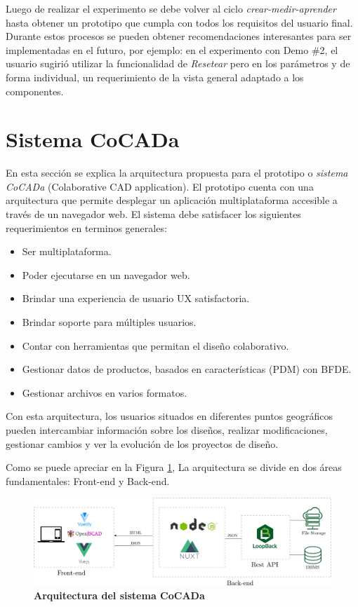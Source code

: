 Luego de realizar el experimento se debe volver al ciclo \textit{crear-medir-aprender} hasta obtener un prototipo que cumpla con todos los requisitos del usuario final. Durante estos procesos se pueden obtener recomendaciones interesantes para ser implementadas en el futuro, por ejemplo: en el experimento con Demo \#2, el usuario sugirió utilizar la funcionalidad de \textit{Resetear} pero en los parámetros y de forma individual, un requerimiento de la vista general adaptado a los componentes.


\clearpage
\section{Sistema CoCADa}

En esta sección se explica la arquitectura propuesta para el prototipo o \textit{sistema CoCADa} (Colaborative CAD application). El prototipo cuenta con una arquitectura que permite desplegar un aplicación multiplataforma accesible a través de un navegador web. El sistema debe satisfacer los siguientes requerimientos en terminos generales:

\begin{itemize}
    \item Ser multiplataforma.
    \item Poder ejecutarse en un navegador web.
    \item Brindar una experiencia de usuario UX satisfactoria.
    \item Brindar soporte para múltiples usuarios.
    \item Contar con herramientas que permitan el diseño colaborativo.
    \item Gestionar datos de productos, basados en características (PDM) con BFDE.
    \item Gestionar archivos en varios formatos.
\end{itemize}

Con esta arquitectura, los usuarios situados en diferentes puntos geográficos pueden intercambiar información sobre los diseños, realizar modificaciones, gestionar cambios y ver la evolución de los proyectos de diseño.

Como se puede apreciar en la Figura \ref{fig:sistema0}, La arquitectura se divide en dos áreas fundamentales: Front-end y Back-end.
\vspace{5mm}
\begin{figure}[h]
    \includegraphics[width=16cm]{Img/Desarrollo/sistema0.png}
    \centering
    \caption{\textbf{ \footnotesize{Arquitectura del sistema CoCADa}}}
     \label{fig:sistema0}
\end{figure}



